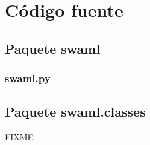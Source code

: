 
\chapter{Código fuente\label{sec:source}} 

\section*{Paquete swaml}

\subsection*{swaml.py}



\section*{Paquete swaml.classes}

FIXME
